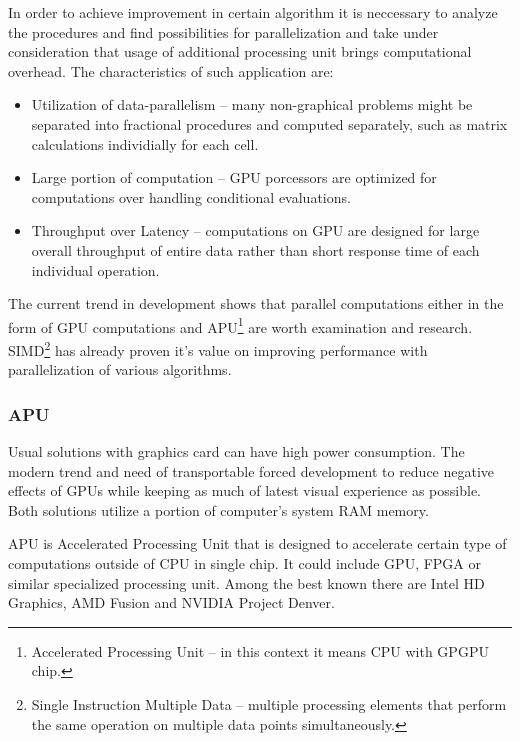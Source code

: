 In order to achieve improvement in certain algorithm it is neccessary to analyze
the procedures and find possibilities for parallelization and take under 
consideration that usage of additional processing unit brings computational 
overhead. The characteristics of such application are\cite{Owens:2008:GC}:

\begin{itemize}
\item Utilization of data-parallelism -- many non-graphical problems might be
separated into fractional procedures and computed separately, such as matrix 
calculations individially for each cell.
\item Large portion of computation -- GPU porcessors are optimized for 
computations over handling conditional evaluations.
\item Throughput over Latency -- computations on GPU are designed for large
overall throughput of entire data rather than short response time of each 
individual operation.
\end{itemize}

The current trend in development shows that parallel computations either in the
form of GPU computations and APU\footnote{ Accelerated Processing Unit -- 
in this context it means CPU with GPGPU chip.} are
worth examination and research. SIMD\footnote{ Single Instruction Multiple Data 
-- multiple processing elements that perform the same operation on multiple data 
points simultaneously\cite{Flynn:1972}.} has already proven it's value on 
improving performance with parallelization of various 
algorithms\cite{nvidia:sample, amd:apps}.

%





\subsubsection*{APU}
Usual solutions with graphics card can have high power consumption. The modern
trend and need of transportable forced development to reduce negative 
effects of GPUs while keeping as much of latest visual experience as 
possible\cite{apu:efficiency}.
Both solutions utilize a portion of computer's system RAM memory.

APU is Accelerated Processing Unit that is designed to accelerate certain
type of computations outside of CPU in single chip. It could 
include GPU, FPGA or similar specialized processing unit. Among the best known 
there are Intel HD Graphics\cite{intel:apu}, AMD Fusion\cite{amd:apu} and NVIDIA 
Project Denver\cite{nvidia:apu}.

